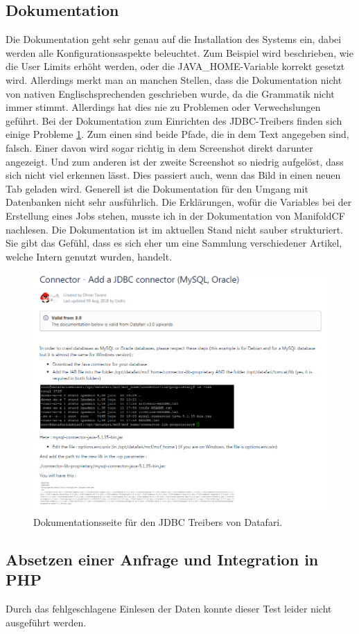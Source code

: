 \subsection{Dokumentation}

Die Dokumentation geht sehr genau auf die Installation des Systems ein, dabei werden alle Konfigurationsaspekte beleuchtet. Zum Beispiel wird beschrieben, wie die User Limits erhöht werden, oder die JAVA\_HOME-Variable korrekt gesetzt wird. Allerdings merkt man an manchen Stellen, dass die Dokumentation nicht von nativen Englischsprechenden geschrieben wurde, da die Grammatik nicht immer stimmt. Allerdings hat dies nie zu Problemen oder Verwechslungen geführt.
Bei der Dokumentation zum Einrichten des JDBC-Treibers finden sich einige Probleme \ref{img:datafariJDBC}. Zum einen sind beide Pfade, die in dem Text angegeben sind, falsch. Einer davon wird sogar richtig in dem Screenshot direkt darunter angezeigt. Und zum anderen ist der zweite Screenshot so niedrig aufgelöst, dass sich nicht viel erkennen lässt. Dies passiert auch, wenn das Bild in einen neuen Tab geladen wird. Generell ist die Dokumentation für den Umgang mit Datenbanken nicht sehr ausführlich. Die Erklärungen, wofür die Variables bei der Erstellung eines Jobs stehen, musste ich in der Dokumentation von ManifoldCF nachlesen.
Die Dokumentation ist im aktuellen Stand nicht sauber strukturiert. Sie gibt das Gefühl, dass es sich eher um eine Sammlung verschiedener Artikel, welche Intern genutzt wurden, handelt.

\begin{figure}
	\centering
	\includegraphics[width=1\linewidth]{images/datafari_doku_wrong_path.png}
	\caption{Dokumentationsseite für den JDBC Treibers von Datafari.}
	\label{img:datafariJDBC}
\end{figure}


\subsection{Absetzen einer Anfrage und Integration in PHP}

Durch das fehlgeschlagene Einlesen der Daten konnte dieser Test leider nicht ausgeführt werden.
